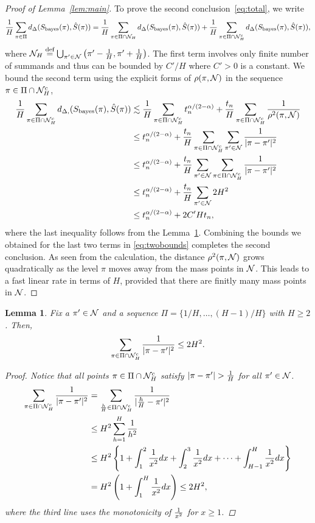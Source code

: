 \documentclass[11pt]{article}
\theoremstyle{plain}
\newtheorem{lem}{Lemma}
\theoremstyle{definition}
\def\bayesS{S_{\textup{bayes}}}
\begin{document}
\begin{proof}[Proof of Lemma~\ref{lem:main}]
To prove the second conclusion~\eqref{eq:total}, we write 
\begin{align}\label{eq:twobounds}
{1\over H}\sum_{\pi \in \Pi} d_{\Delta}(\bayesS(\pi),\hat S(\pi))={1\over H}\sum_{\pi \in \Pi\cap \tN_H} d_{\Delta}(\bayesS(\pi),\hat S(\pi))+{1\over H}\sum_{\pi \in \Pi\cap \tN_H^c} d_{\Delta}(\bayesS(\pi),\hat S(\pi)),
\end{align}
where $\mathcal{N}_H \stackrel{\text{def}}{=}\bigcup_{\pi'\in\mathcal{N}}\left(\pi'-\frac{1}{H},\pi'+\frac{1}{H}\right)$.
The first term involves only finite number of summands and thus can be bounded by $C'/H$ where $C'>0$ is a constant.  We bound the second term using the explicit forms of $\rho(\pi, \mathcal{N})$ in the sequence $\pi \in\Pi\cap \mathcal{N}_H^c$,
\begin{align}
{1\over H}\sum_{\pi \in \Pi\cap \tN_H^c} d_{\Delta,}(\bayesS(\pi),\hat S(\pi)) &\lesssim  {1\over H}\sum_{\pi\in \Pi\cap \tN_H^c} t_n^{\alpha/(2-\alpha)}+{t_n\over H}\sum_{\pi \in \Pi\cap \tN_H^c}{1\over \rho^2(\pi, \tN)}\\
&\leq t_n^{\alpha/(2-\alpha)}+{t_n\over H} \sum_{\pi \in \Pi\cap \tN_H^c} \sum_{\pi' \in \tN}{1\over |\pi-\pi'|^2}\\
&\leq  t_n^{\alpha/(2-\alpha)}+{t_n\over H} \sum_{\pi'\in \tN} \sum_{\pi \in \Pi\cap \tN_H^c}{1\over |\pi-\pi'|^2}\\
&\leq t_n^{\alpha/(2-\alpha)}+ {t_n\over H} \sum_{\pi'\in \tN} 2H^2\\
&\leq t_n^{\alpha/(2-\alpha)}+ 2C'Ht_n,
\end{align}
where the last inequality follows from the Lemma~\ref{lem:H}.  Combining the bounds we obtained for the last two terms in \eqref{eq:twobounds} completes the second conclusion.  As seen from the calculation, the distance $\rho^2(\pi, \mathcal{N})$ grows quadratically as the level $\pi$ moves away from the mass points in $\mathcal{N}$. This leads to a fast linear rate in terms of $H$, provided that there are finitly many mass points in $\mathcal{N}$.
\end{proof}

\begin{lem}\label{lem:H}
Fix a $\pi'\in\mathcal{N}$ and a sequence $\Pi=\{1/H,\ldots,(H-1)/H\}$ with $H\geq 2$. Then, 
\[
\sum_{\pi \in \Pi\cap \mathcal{N}_H^c}{1\over 
|\pi-\pi'|^2}\leq 2H^2. 
\]
\begin{proof}
Notice that  all points $\pi\in\Pi\cap\mathcal{N}_H^c$ satisfy 
$|\pi-\pi'|>{1\over H}$ for all $\pi'\in\mathcal{N}$.
\begin{align}
   \sum_{\pi \in \Pi\cap \mathcal{N}_H^c}{1\over |\pi-\pi'|^2}&= \sum_{\frac{h}{H}\in\Pi\cap \mathcal{N}_H^c } {1\over |\frac{h}{H}-\pi'|^2}\\
   &\leq H^2 \sum_{h=1}^{H}{1 \over h^2}\\
 &\leq H^2\left\{ 1+\int_{1}^2{1\over x^2}dx+ \int_{2}^3{1\over x^2}dx+\cdots + \int_{H-1}^H{1\over x^2}dx\right\}\\
&= H^2\left(1+\int^{H}_{1}{1\over x^2}dx\right) \leq 2H^2,
\end{align}
 where the third line uses the monotonicity of ${1\over x^2}$ for $x\geq 1$. 
 \end{proof}
\end{lem}
\end{document}
